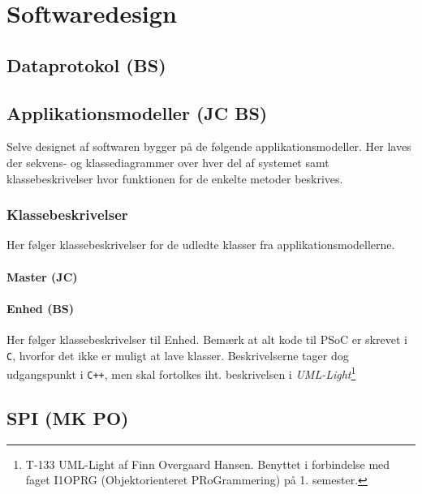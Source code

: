 \chapter{Softwaredesign}

\section{Dataprotokol (BS)}\label{header:dataprotokol}


\section{Applikationsmodeller (JC BS)}
Selve designet af softwaren bygger på de følgende applikationsmodeller. Her laves der sekvens- og klassediagrammer over hver del af systemet samt klassebeskrivelser hvor funktionen for de enkelte metoder beskrives.



\subsection{Klassebeskrivelser}
Her følger klassebeskrivelser for de udledte klasser fra applikationsmodellerne.

\subsubsection{Master (JC)}





\subsubsection{Enhed (BS)}
Her følger klassebeskrivelser til Enhed. 
Bemærk at alt kode til PSoC er skrevet i \verb+C+, hvorfor det ikke er muligt at lave klasser. Beskrivelserne tager dog udgangspunkt i \verb-C++-, men skal fortolkes iht. beskrivelsen i \textit{UML-Light}\footnote{T-133 UML-Light af Finn Overgaard Hansen. Benyttet i forbindelse med faget I1OPRG (Objektorienteret PRoGrammering) på 1. semester.} 






\section{SPI (MK PO)}

